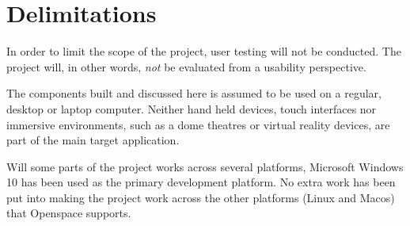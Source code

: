 

\section{Delimitations}
\label{sec:delimitations}


In order to limit the scope of the project, user testing will not be conducted. The project will, in other words, \emph{not} be evaluated from a usability perspective.

The components built and discussed here is assumed to be used on a regular, desktop or laptop computer. Neither hand held devices, touch interfaces nor immersive environments, such as a dome theatres or virtual reality devices, are part of the main target application.

Will some parts of the project works across several platforms, Microsoft Windows 10 has been used as the primary development platform. No extra work has been put into making the project work across the other platforms (Linux and Macos) that Openspace supports.
